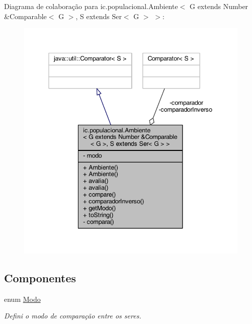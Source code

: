 Diagrama de colaboração para ic.\-populacional.\-Ambiente$<$ G extends Number \&Comparable$<$ G $>$, S extends Ser$<$ G $>$ $>$\-:
\nopagebreak
\begin{figure}[H]
\begin{center}
\leavevmode
\includegraphics[width=345pt]{classic_1_1populacional_1_1_ambiente_3_01_g_01extends_01_number_01_6_comparable_3_01_g_01_4_00_0eeae7a3fbda8cfca961f3b7ed4d11e09}
\end{center}
\end{figure}
\subsection*{Componentes}
\begin{DoxyCompactItemize}
\item 
enum \hyperlink{enumic_1_1populacional_1_1_ambiente_3_01_g_01extends_01_number_01_6_comparable_3_01_g_01_4_00_0156fb2ffb0f78f5b655aaee5b0df471a7}{Modo}
\begin{DoxyCompactList}\small\item\em Defini o modo de comparação entre os seres. \end{DoxyCompactList}\end{DoxyCompactItemize}
